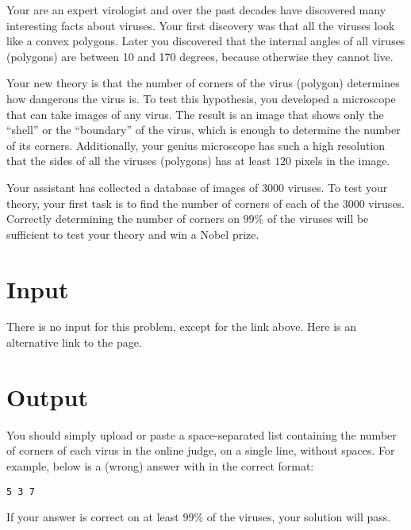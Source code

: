 Your are an expert virologist and over the past decades have discovered many interesting facts about viruses.
Your first discovery was that all the viruses look like a convex polygons.
Later you discovered that the internal angles of all viruses (polygons) are between 10 and 170 degrees, because otherwise they cannot live.

Your new theory is that the number of corners of the virus (polygon) determines how dangerous the virus is.
To test this hypothesis, you developed a microscope that can take images of any virus.
The result is an image that shows only the ``shell'' or the ``boundary'' of the virus, which is enough to determine the number of its corners.
Additionally, your genius microscope has such a high resolution that the sides of all the viruses (polygons) has at least $120$ pixels in the image.

Your assistant has collected a database of images of $3000$ viruses.
To test your theory, your first task is to find the number of corners of each of the $3000$ viruses.
Correctly determining the number of corners on $99\%$ of the viruses will be sufficient to test your theory and win a Nobel prize.

\section*{Input}
There is no input for this problem, except for the link above.
Here is an alternative link to the page.

\section*{Output}
You should simply upload or paste a space-separated list containing the number of corners of each virus in the online judge, on a single line, without spaces.
For example, below is a (wrong) answer with in the correct format:
\begin{center}
    \texttt{5 3 7}
\end{center}
If your answer is correct on at least $99\%$ of the viruses, your solution will pass.

%
%
%
